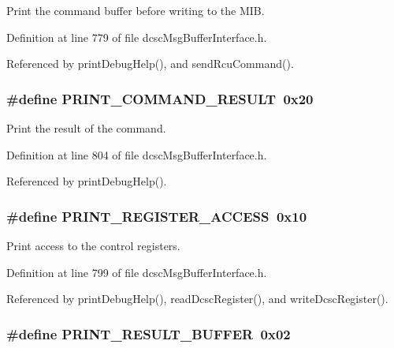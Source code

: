 Print the command buffer before writing to the MIB. 



Definition at line 779 of file dcsc\-Msg\-Buffer\-Interface.h.

Referenced by print\-Debug\-Help(), and send\-Rcu\-Command().\hypertarget{group__dcsc__msg__buffer__access_g2f996fd7aaf5d3df34642fc4dcd9ef66}{
\subsubsection[PRINT\_\-COMMAND\_\-RESULT]{\setlength{\rightskip}{0pt plus 5cm}\#define PRINT\_\-COMMAND\_\-RESULT~0x20}}
\label{group__dcsc__msg__buffer__access_g2f996fd7aaf5d3df34642fc4dcd9ef66}


Print the result of the command. 



Definition at line 804 of file dcsc\-Msg\-Buffer\-Interface.h.

Referenced by print\-Debug\-Help().\hypertarget{group__dcsc__msg__buffer__access_gc3ceb106888209dd1796a27d49f567d8}{
\subsubsection[PRINT\_\-REGISTER\_\-ACCESS]{\setlength{\rightskip}{0pt plus 5cm}\#define PRINT\_\-REGISTER\_\-ACCESS~0x10}}
\label{group__dcsc__msg__buffer__access_gc3ceb106888209dd1796a27d49f567d8}


Print access to the control registers. 



Definition at line 799 of file dcsc\-Msg\-Buffer\-Interface.h.

Referenced by print\-Debug\-Help(), read\-Dcsc\-Register(), and write\-Dcsc\-Register().\hypertarget{group__dcsc__msg__buffer__access_gcbc0bfb0d39b96550d664a58aa705cbb}{
\subsubsection[PRINT\_\-RESULT\_\-BUFFER]{\setlength{\rightskip}{0pt plus 5cm}\#define PRINT\_\-RESULT\_\-BUFFER~0x02}}
\label{group__dcsc__msg__buffer__access_gcbc0bfb0d39b96550d664a58aa705cbb}


